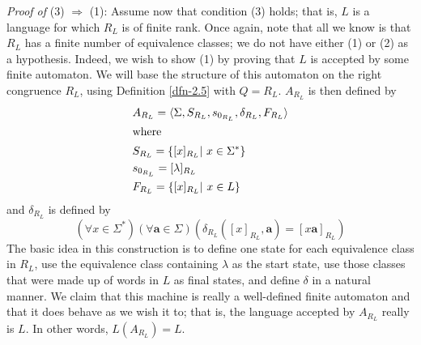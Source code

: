 \begin{thm}
\emph{Proof of} (3) $\Rightarrow$ (1): Assume now that condition (3) holds; that
is, $L$ is a language for which $R_L$ is of finite rank. Once again, note that
all we know is that $R_L$ has a finite number of equivalence classes; we do not
have either (1) or (2) as a hypothesis. Indeed, we wish to show (1) by proving
that $L$ is accepted by some finite automaton. We will base the structure of
this automaton on the right congruence $R_L$, using Definition \ref{dfn-2.5} with
$Q = R_L$. $A_{R_L}$ is then defined by
\begin{align*}
& A_{R_L} =\langle\Sigma,S_{R_L},s_{0_{R_L}},\delta_{R_L},F_{R_L}\rangle \\
\intertext{where}
& S_{R_L}=\{[x]_{R_L}|\ x \in \Sigma^*\} \\
& s_{0_{R_L}} = [\lambda]_{R_L} \\
& F_{R_L} =\{[x]_{R_L}|\ x \in L\}
\end{align*}
and $\delta_{R_L}$ is defined by
\[ (\forall x \in \Sigma^*)(\forall\pmb{a}\in\Sigma)(\delta_{R_L}([x]_{R_L},
	\pmb{a}) = [x\pmb{a}]_{R_L}) \]
The basic idea in this construction is to define one state for each equivalence
class in $R_L$, use the equivalence class containing $\lambda$ as the start
state, use those classes that were made up of words in $L$ as final states, and
define $\delta$ in a natural manner. We claim that this machine is really a
well-defined finite automaton and that it does behave as we wish it to; that is,
the language accepted by $A_{R_L}$ really is $L$. In other words, $L(A_{R_L})=L$.


\end{thm}
